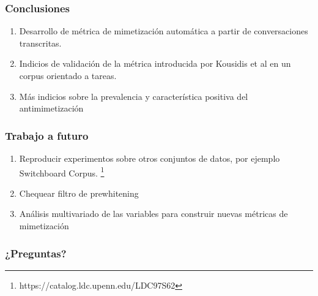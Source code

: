 \begin{frame}
\frametitle{Conclusiones}

\begin{enumerate}
  \item Desarrollo de métrica de mimetización automática a partir de conversaciones transcritas.
  \item Indicios de validación de la métrica introducida por Kousidis et al en un corpus orientado a tareas.
  \item Más indicios sobre la prevalencia y característica positiva del antimimetización
\end{enumerate}


\end{frame}

\begin{frame}
\frametitle{Trabajo a futuro}

\begin{enumerate}
  \item Reproducir experimentos sobre otros conjuntos de datos, por ejemplo Switchboard Corpus. \footnote{https://catalog.ldc.upenn.edu/LDC97S62}
  \item Chequear filtro de prewhitening
  \item Análisis multivariado de las variables \ap para construir nuevas métricas de mimetización
\end{enumerate}
\end{frame}

\begin{frame}
\frametitle{¿Preguntas?}
\end{frame}
